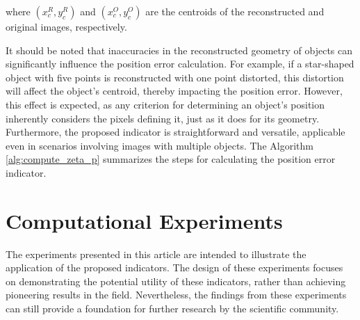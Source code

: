 \documentclass{IEEEtran}
\begin{document}
            \noindent where $(x_c^R, y_c^R)$ and $(x_c^O, y_c^O)$ are the centroids of the reconstructed and original images, respectively.


            It should be noted that inaccuracies in the reconstructed geometry of objects can significantly influence the position error calculation. For example, if a star-shaped object with five points is reconstructed with one point distorted, this distortion will affect the object's centroid, thereby impacting the position error. However, this effect is expected, as any criterion for determining an object's position inherently considers the pixels defining it, just as it does for its geometry. Furthermore, the proposed indicator is straightforward and versatile, applicable even in scenarios involving images with multiple objects. The Algorithm \ref{alg:compute_zeta_p} summarizes the steps for calculating the position error indicator.

            
	
	\section{Computational Experiments}\label{sec:results}
	

        The experiments presented in this article are intended to illustrate the application of the proposed indicators. The design of these experiments focuses on demonstrating the potential utility of these indicators, rather than achieving pioneering results in the field. Nevertheless, the findings from these experiments can still provide a foundation for further research by the scientific community.
\end{document}
